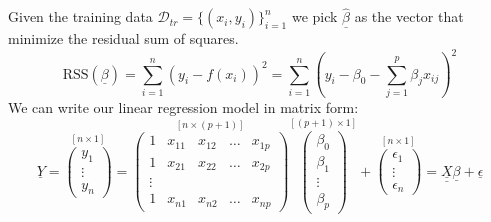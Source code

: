Given the training data $\mathcal{D}_{tr} = \{ (x_i, y_i) \}_{i=1}^n$
we pick $\underline{\hat\beta}$ as the vector that minimize the residual sum of squares.
\[
    \text{RSS}(\underline \beta) = \sum_{i=1}^{n} (y_i - f(x_i))^2 = \sum_{i=1}^{n} \left(y_i - \beta_0 - \sum_{j=1}^{p} \beta_j x_{ij}\right)^2
\]
We can write our linear regression model in matrix form:
\[
    \underline Y = 
    \overset{[n\times 1]}{
        \begin{pmatrix}
            y_1 \\ \vdots \\ y_n 
        \end{pmatrix}
        } =
    \overset{[n\times(p+1)]}{
        \begin{pmatrix}
            1 & x_{11} & x_{12} & \dots & x_{1p} \\
            1 & x_{21} & x_{22} & \dots & x_{2p} \\ \vdots \\ 1 & x_{n1} & x_{n2} & \dots & x_{np}
        \end{pmatrix}
        }
    \overset{[(p+1)\times 1]}{
            \begin{pmatrix}
                \beta_0 \\ \beta_1 \\ \vdots \\ \beta_p 
            \end{pmatrix}
            } +
    \overset{[n\times 1]}{
        \begin{pmatrix}
            \epsilon_1\\
            \vdots \\
            \epsilon_n
        \end{pmatrix}}= \underline{\underline{X}} \underline \beta + \underline \epsilon
\]

